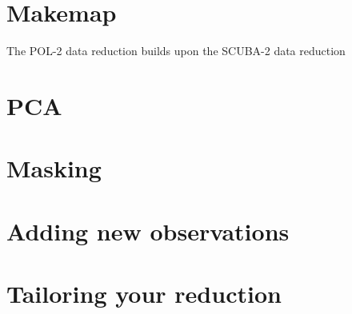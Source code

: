 \section{Makemap}

The POL-2 data reduction builds upon the SCUBA-2 data reduction

\cite{smurf}

\section{PCA}


\section{Masking}


\section{Adding new observations}



\section{Tailoring your reduction}


